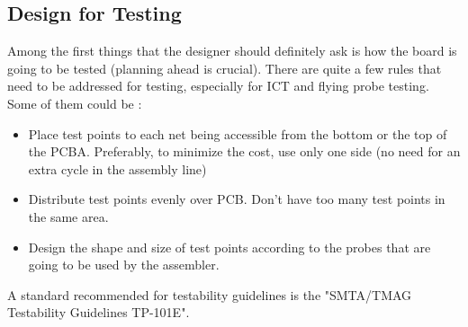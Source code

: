 \documentclass[final]{cubedoc}
\begin{document}
	\subsection{Design for Testing}
	
	
	
	Among the first things that the designer should definitely ask is how the board is going to be tested (planning ahead is crucial). There are quite a few rules that need to be addressed for testing, especially for ICT and flying probe testing. Some of them could be \cite{ema2019hitchhiker}:
	
	\begin{itemize}
		\item Place test points to each net being accessible from the bottom or the top of the PCBA. Preferably, to minimize the cost, use only one side (no need for an extra cycle in the assembly line) 
		
		
		\item Distribute test points evenly over PCB. Don't have too many test points in the same area. 
		\item Design the shape and size of test points according to the probes that are going to be used by the assembler.
	\end{itemize}
	
	A standard recommended for testability guidelines is the "SMTA/TMAG Testability Guidelines TP-101E".
	
\end{document}
